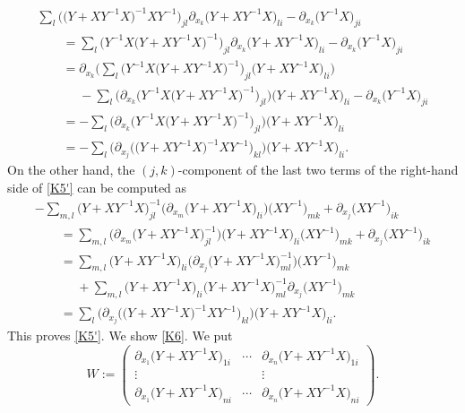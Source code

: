 \documentclass[pdftex]{sigma}
\numberwithin{equation}{section}
\begin{document}
\begin{gather*}
 \sum_{l}\bigl(\bigl(Y+XY^{-1}X\bigr)^{-1}XY^{-1}\bigr)_{jl}\partial_{x_k}\bigl(Y+XY^{-1}X\bigr)_{li}-\partial_{x_k}\bigl(Y^{-1}X\bigr)_{ji}\\
\qquad= \sum_{l}\bigl(Y^{-1}X\bigl(Y+XY^{-1}X\bigr)^{-1}\bigr)_{jl}\partial_{x_k}\bigl(Y+XY^{-1}X\bigr)_{li}-\partial_{x_k}\bigl(Y^{-1}X\bigr)_{ji} \\
\qquad= \partial_{x_k} \Big(\sum_{l}\bigl(Y^{-1}X\bigl(Y+XY^{-1}X\bigr)^{-1}\bigr)_{jl}\bigl(Y+XY^{-1}X\bigr)_{li}\Big)\\
\qquad\phantom{=}{} -\sum_{l}\bigl(\partial_{x_k} \bigl(Y^{-1}X\bigl(Y+XY^{-1}X\bigr)^{-1}\bigr)_{jl}\bigr)\bigl(Y+XY^{-1}X\bigr)_{li}-\partial_{x_k}\bigl(Y^{-1}X\bigr)_{ji} \\
\qquad= -\sum_{l}\bigl(\partial_{x_k} \bigl(Y^{-1}X\bigl(Y+XY^{-1}X\bigr)^{-1}\bigr)_{jl}\bigr)\bigl(Y+XY^{-1}X\bigr)_{li}\\
\qquad= -\sum_{l}\bigl(\partial_{x_j} \bigl(\bigl(Y+XY^{-1}X\bigr)^{-1}XY^{-1}\bigr)_{kl}\bigr)\bigl(Y+XY^{-1}X\bigr)_{li}.
\end{gather*}
On the other hand, the $(j, k)$-component of the last two terms of the right-hand side of \eqref{K5'} can be computed as
\begin{gather*}
-\sum_{m, l} \bigl(Y+XY^{-1}X\bigr)^{-1}_{jl}\bigl(\partial_{x_m}\bigl(Y+XY^{-1}X\bigr)_{li}\bigr)\bigl(XY^{-1}\bigr)_{mk}+\partial_{x_j}\bigl(XY^{-1}\bigr)_{ik}\\
\qquad=\sum_{m, l} \bigl(\partial_{x_m}\bigl(Y+XY^{-1}X\bigr)^{-1}_{jl}\bigr)\bigl(Y+XY^{-1}X\bigr)_{li}\bigl(XY^{-1}\bigr)_{mk}+\partial_{x_j}\bigl(XY^{-1}\bigr)_{ik}\\
\qquad=\sum_{m, l}\bigl(Y+XY^{-1}X\bigr)_{li}\bigl(\partial_{x_j}\bigl(Y+XY^{-1}X\bigr)^{-1}_{ml}\bigr) \bigl(XY^{-1}\bigr)_{mk}\\
\qquad\phantom{=}{} +\sum_{m, l}\bigl(Y+XY^{-1}X\bigr)_{li}\bigl(Y+XY^{-1}X\bigr)^{-1}_{ml}\partial_{x_j}\bigl(XY^{-1}\bigr)_{mk}
\\
\qquad=\sum_{l}\bigl(\partial_{x_j}\bigl(\bigl(Y+XY^{-1}X\bigr)^{-1}XY^{-1}\bigr)_{kl}\bigr) \bigl(Y+XY^{-1}X\bigr)_{li}.
\end{gather*}
This proves \eqref{K5'}. We show \eqref{K6}. We put
\[
W:=
\begin{pmatrix}
\partial_{x_1}\bigl(Y+XY^{-1}X\bigr)_{1i} & \cdots & \partial_{x_n}\bigl(Y+XY^{-1}X\bigr)_{1i} \\
\vdots & & \vdots \\
\partial_{x_1}\bigl(Y+XY^{-1}X\bigr)_{ni} & \cdots & \partial_{x_n}\bigl(Y+XY^{-1}X\bigr)_{ni}
\end{pmatrix}.
\]
\end{document}
